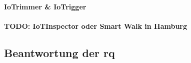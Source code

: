 \paragraph{IoTrimmer \& IoTrigger} %
\label{sec:Hauptteil:ssec:Regulationsmöglichkeiten:para:IoTrimmer and IoTrigger}


\paragraph{TODO: IoTInspector oder Smart Walk in Hamburg} %
\label{sec:Hauptteil:ssec:Regulationsmöglichkeiten:para:Natix}



\subsection{Beantwortung der \acl{rq}}
\label{sec:Hauptteil:ssec:Beantwortung der wissenschaftlichen Fragen}

